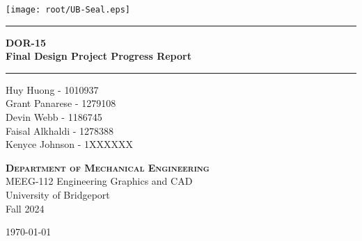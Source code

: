 
\begin{titlepage}
\begin{center}
\vspace{1 cm}
\texttt{[image: root/UB-Seal.eps]}~\\[1 cm]
\vspace{1 cm}

\hrule
\vspace{.5 cm}
{ \huge \bfseries DOR-15}
\vspace{.5 cm}
\\{\huge \bfseries Final Design Project Progress Report} %
\vspace{.5 cm}

\hrule
\vspace{1 cm}
\centering

Huy Huong - 1010937\\
Grant Panarese - 1279108\\
Devin Webb - 1186745\\
Faisal Alkhaldi - 1278388\\
Kenyce Johnson - 1XXXXXX\\


\vspace{.5 cm}

\textsc{\textbf{Department of Mechanical Engineering}}\\
\centering
    MEEG-112 Engineering Graphics and CAD \\
    University of Bridgeport \\
    Fall 2024 \\

\vspace{1 cm}

\centering \today %
\end{center}
\end{titlepage}